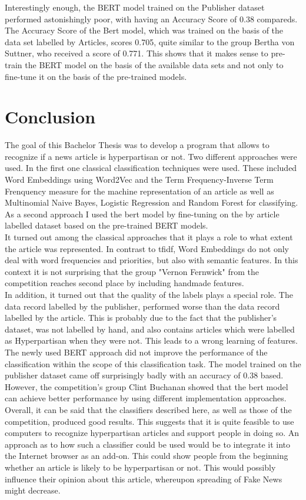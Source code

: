 \documentclass[a4paper, 11pt,titlepage,oneside,openany]{book}
\begin{document}
\newpage
\indent Interestingly enough, the BERT model trained on the Publisher dataset performed astonishingly poor, with having an Accuracy Score of 0.38 compareds. The Accuracy Score of the Bert model, which was trained on the basis of the data set labelled by Articles, scores 0.705, quite similar to the group Bertha von Suttner, who received a score of 0.771. This shows that it makes sense to pre-train the BERT model on the basis of the available data sets and not only to fine-tune it on the basis of the pre-trained models. 

\chapter{Conclusion}
The goal of this Bachelor Thesis was to develop a program that allows to recognize if a news article is hyperpartisan or not. Two different approaches were used. In the first one classical classification techniques were used. These included Word Embeddings using Word2Vec and the Term Frequency-Inverse Term Frenquency measure for the machine representation of an article as well as Multinomial Naive Bayes, Logistic Regression and Random Forest for classifying. As a second approach I used the \gls{bert} model by fine-tuning on the by article labelled dataset based on the pre-trained BERT models. \\
\indent It turned out among the classical approaches that it plays a role to what extent the article was represented. In contrast to \gls{tfidf}, Word Embeddings do not only deal with word frequencies and priorities, but also with semantic features. In this context it is not surprising that the group "Vernon Fernwick" from the competition reaches second place by including handmade features. \\
\indent In addition, it turned out that the quality of the labels plays a special role. The data record labelled by the publisher, performed worse than the data record labelled by the article. This is probably due to the fact that the publisher's dataset, was not labelled by hand, and also contains articles which were labelled as Hyperpartisan when they were not. This leads to a wrong learning of features.\\
\indent The newly used BERT approach did not improve the performance of the classification within the scope of this classification task. The model trained on the publisher dataset came off surprisingly badly with an accuracy of 0.38 based. However, the competition's group Clint Buchanan showed that the \gls{bert} model can achieve better performance by using different implementation approaches.\\
\indent Overall, it can be said that the classifiers described here, as well as those of the competition, produced good results. This suggests that it is quite feasible to use computers to recognize hyperpartisan articles and support people in doing so.
An approach as to how such a classifier could be used would be to integrate it into the Internet browser as an add-on. This could show people from the beginning whether an article is likely to be hyperpartisan or not. This would possibly influence their opinion about this article, whereupon spreading of Fake News might decrease.
\end{document}

